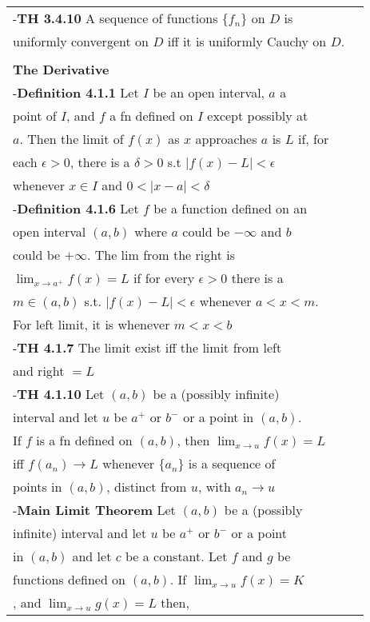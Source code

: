 \documentclass[10 pt,landscape]{article}
\begin{document}
\begin{multicols}{4}
\begin{tabular}{@{}ll@{}}
\end{tabular}

\begin{tabular}{@{}ll@{}}
-\textbf{TH 3.4.10} A sequence of functions $\{f_n\}$ on $D$ is \\ uniformly convergent on $D$ iff it is uniformly Cauchy on $D$.\\

\\
\textbf{The Derivative}\\
-\textbf{Definition 4.1.1} Let $I$ be an open interval, $a$ a \\point of $I$, and $f$ a fn defined on $I$ except possibly at \\$a$. Then the limit of $f(x)$ as $x$ approaches $a$ is $L$ if, for \\ each $\epsilon >0$, there is a $\delta > 0$ s.t $|f(x)-L| < \epsilon$ \\whenever $x \in I$ and $0<|x-a|<\delta$\\
-\textbf{Definition 4.1.6} Let $f$ be a function defined on an \\open interval $(a,b)$ where $a$ could be $-\infty$ and $b$ \\could be $+\infty$. The lim from the right is\\ $\lim_{x \to a^{+}} f(x)=L$ if for every $\epsilon >0 $ there is a \\ $m \in (a,b)$ s.t. $|f(x)-L|<\epsilon $ whenever $a<x<m$. \\
For left limit, it is whenever $m<x<b$\\
-\textbf{TH 4.1.7} The limit exist iff the limit from left \\and right $=L$\\
-\textbf{TH 4.1.10} Let $(a,b)$ be a (possibly infinite) \\interval
and let $u$ be $a^{+}$ or $b^{-}$ or a point in $(a,b)$. \\If $f$ is a fn
defined on $(a,b)$, then $\lim_{x \to u} f(x)=L$\\ iff  $f(a_n) \to L$ whenever $\{a_n\}$ is a sequence of \\points in $(a,b)$, distinct from $u$, with $a_n \to u$\\
-\textbf{Main Limit Theorem} Let $(a,b)$ be a (possibly \\ infinite) interval and let $u$ be $a^{+}$ or $b^{-}$ or a point \\in $(a,b)$ and let $c$ be a constant. Let $f$ and $g$ be \\ functions defined on $(a,b)$. If $\lim_{x \to u} f(x)=K$ \\, and $\lim_{x \to u} g(x)=L$ then,\\

\end{tabular}
\end{multicols}
\end{document}
